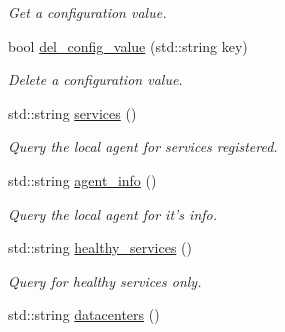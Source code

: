 \begin{DoxyCompactItemize}
\begin{DoxyCompactList}\small\item\em Get a configuration value. \end{DoxyCompactList}\item 
\hypertarget{classConsulAdmin_a177d6d946f41c4efa8ad0746e04b3641}{bool \hyperlink{classConsulAdmin_a177d6d946f41c4efa8ad0746e04b3641}{del\-\_\-config\-\_\-value} (std\-::string key)}\label{classConsulAdmin_a177d6d946f41c4efa8ad0746e04b3641}

\begin{DoxyCompactList}\small\item\em Delete a configuration value. \end{DoxyCompactList}\item 
\hypertarget{classConsulAdmin_a0e06b8914ba53221ad7756b1afe16d00}{std\-::string \hyperlink{classConsulAdmin_a0e06b8914ba53221ad7756b1afe16d00}{services} ()}\label{classConsulAdmin_a0e06b8914ba53221ad7756b1afe16d00}

\begin{DoxyCompactList}\small\item\em Query the local agent for services registered. \end{DoxyCompactList}\item 
\hypertarget{classConsulAdmin_a815abcc0f65f0f20d27e4832d1c08994}{std\-::string \hyperlink{classConsulAdmin_a815abcc0f65f0f20d27e4832d1c08994}{agent\-\_\-info} ()}\label{classConsulAdmin_a815abcc0f65f0f20d27e4832d1c08994}

\begin{DoxyCompactList}\small\item\em Query the local agent for it's info. \end{DoxyCompactList}\item 
\hypertarget{classConsulAdmin_a65391086283846fb4056a8f84105f9bd}{std\-::string \hyperlink{classConsulAdmin_a65391086283846fb4056a8f84105f9bd}{healthy\-\_\-services} ()}\label{classConsulAdmin_a65391086283846fb4056a8f84105f9bd}

\begin{DoxyCompactList}\small\item\em Query for healthy services only. \end{DoxyCompactList}\item 
\hypertarget{classConsulAdmin_a9086263fd0d739607b30706dc86ad047}{std\-::string \hyperlink{classConsulAdmin_a9086263fd0d739607b30706dc86ad047}{datacenters} ()}\label{classConsulAdmin_a9086263fd0d739607b30706dc86ad047}


\end{DoxyCompactItemize}
